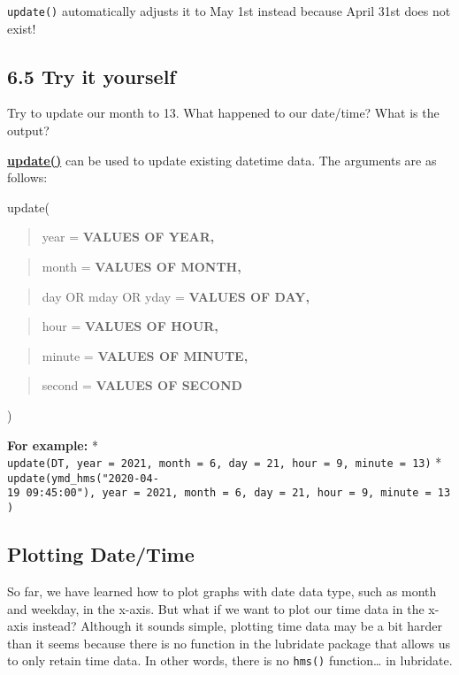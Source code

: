 \documentclass[
]{book}
\begin{document}
\texttt{update()} automatically adjusts it to May 1st instead because April 31st does not exist!

\hypertarget{try-it-yourself-32}{%
\subsection{6.5 Try it yourself}\label{try-it-yourself-32}}

Try to update our month to 13. What happened to our date/time? What is the output?

\textbf{\href{https://lubridate.tidyverse.org/reference/DateTimeUpdate.html}{update()}} can be used to update existing datetime data. The arguments are as follows:

update(

\begin{quote}
year = \textbf{VALUES OF YEAR,}
\end{quote}

\begin{quote}
month = \textbf{VALUES OF MONTH,}
\end{quote}

\begin{quote}
day OR mday OR yday = \textbf{VALUES OF DAY,}
\end{quote}

\begin{quote}
hour = \textbf{VALUES OF HOUR,}
\end{quote}

\begin{quote}
minute = \textbf{VALUES OF MINUTE,}
\end{quote}

\begin{quote}
second = \textbf{VALUES OF SECOND}
\end{quote}

)

\textbf{For example:}
* \texttt{update(DT,\ year\ =\ 2021,\ month\ =\ 6,\ day\ =\ 21,\ hour\ =\ 9,\ minute\ =\ 13)}
* \texttt{update(ymd\_hms("2020-04-19\ 09:45:00"),\ year\ =\ 2021,\ month\ =\ 6,\ day\ =\ 21,\ hour\ =\ 9,\ minute\ =\ 13)}

\hypertarget{plotting-datetime}{%
\subsection{Plotting Date/Time}\label{plotting-datetime}}

So far, we have learned how to plot graphs with date data type, such as month and weekday, in the x-axis. But what if we want to plot our time data in the x-axis instead? Although it sounds simple, plotting time data may be a bit harder than it seems because there is no function in the lubridate package that allows us to only retain time data. In other words, there is no \texttt{hms()} function\ldots{} in lubridate.
\end{document}

